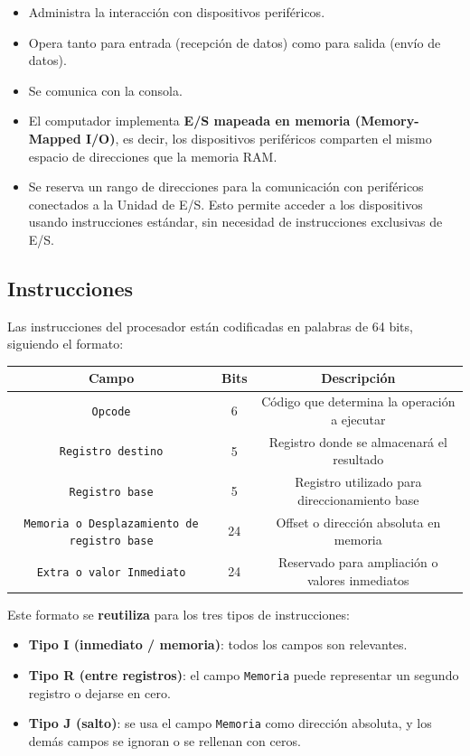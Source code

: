 \documentclass{article}
\begin{document}
\begin{itemize}
    \item Administra la interacción con dispositivos periféricos.
    \item Opera tanto para entrada (recepción de datos) como para salida (envío de datos).
    \item Se comunica con la consola.
    \item El computador implementa \textbf{E/S mapeada en memoria (Memory-Mapped I/O)}, es decir, los dispositivos periféricos comparten el mismo espacio de direcciones que la memoria RAM.
    \item Se reserva un rango de direcciones para la comunicación con periféricos conectados a la Unidad de E/S. Esto permite acceder a los dispositivos usando instrucciones estándar, sin necesidad de instrucciones exclusivas de E/S.
\end{itemize}


\subsection{Instrucciones}

Las instrucciones del procesador están codificadas en palabras de 64 bits, siguiendo el formato:

\begin{table}[h!]
    \centering
    \begin{tabular}{|c|c|c|}
    \hline
    \textbf{Campo} & \textbf{Bits} & \textbf{Descripción} \\
    \hline
    \texttt{Opcode} & 6 & Código que determina la operación a ejecutar \\
    \texttt{Registro destino} & 5 & Registro donde se almacenará el resultado \\
    \texttt{Registro base} & 5 & Registro utilizado para direccionamiento base \\
    \texttt{Memoria o Desplazamiento de registro base} & 24 & Offset o dirección absoluta en memoria \\
    \texttt{Extra o valor Inmediato} & 24 & Reservado para ampliación o valores inmediatos \\
    \hline
    \end{tabular}
\end{table}

Este formato se \textbf{reutiliza} para los tres tipos de instrucciones:

\begin{itemize}
    \item \textbf{Tipo I (inmediato / memoria)}: todos los campos son relevantes.
    \item \textbf{Tipo R (entre registros)}: el campo \texttt{Memoria} puede representar un segundo registro o dejarse en cero.
    \item \textbf{Tipo J (salto)}: se usa el campo \texttt{Memoria} como dirección absoluta, y los demás campos se ignoran o se rellenan con ceros.
\end{itemize}
\end{document}

